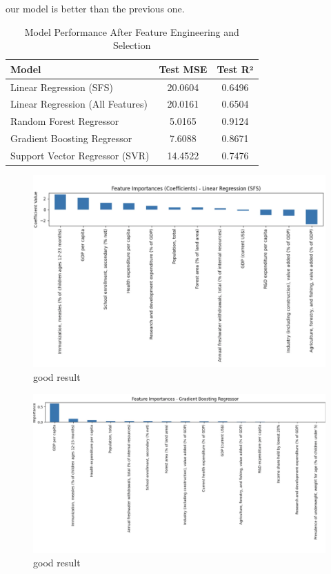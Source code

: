 \documentclass{article}
\begin{document}
our model is better than the previous one.

\begin{table}[h]
    \centering
    \caption{Model Performance After Feature Engineering and Selection}
    \label{tab:model_performance_improved}
    \begin{tabular}{|l|c|c|}
        \hline
        \textbf{Model} & \textbf{Test MSE} & \textbf{Test R²} \\
        \hline
        Linear Regression (SFS) & 20.0604 & 0.6496 \\
        Linear Regression (All Features) & 20.0161 & 0.6504 \\
        Random Forest Regressor & 5.0165 & 0.9124 \\
        Gradient Boosting Regressor & 7.6088 & 0.8671 \\
        Support Vector Regressor (SVR) & 14.4522 & 0.7476 \\
        \hline
    \end{tabular}
\end{table}

\begin{figure}[h]
    \centering
    \includegraphics[width=0.8\columnwidth]{./pic/T1.c.3.png} %
    \caption{good result}
    \label{fig:correlation_heatmap}
\end{figure}
\begin{figure}[h]
    \centering
    \includegraphics[width=0.8\columnwidth]{./pic/T1.c.4.png} %
    \caption{good result}
    \label{fig:correlation_heatmap}
\end{figure}
\end{document}
